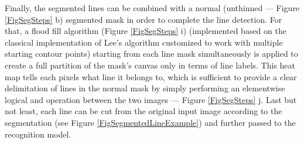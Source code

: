 Finally, the segmented lines can be combined with a normal (unthinned --- Figure \ref{FigSegSteps} b) segmented mask in order to complete the line detection. For that, a flood fill algorithm (Figure \ref{FigSegSteps} i) (implemented based on the classical implementation of Lee's algorithm \cite{lee} customized to work with multiple starting contour points) starting from each line mask simultaneously is applied to create a full partition of the mask's canvas only in terms of line labels. This heat map tells each pixels what line it belongs to, which is sufficient to provide a clear delimitation of lines in the normal mask by simply performing an elementwise logical and operation between the two images --- Figure \ref{FigSegSteps} j. Last but not least, each line can be cut from the original input image according to the segmentation (see Figure \ref{FigSegmentedLineExample}) and further passed to the recognition model.